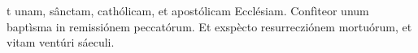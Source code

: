 t unam, sânctam, cathólicam, et apostólicam Ecclésiam. Confìteor unum baptìsma in remissiónem peccatórum. Et exspècto resurrecziónem mortuórum, et vitam ventúri sáeculi.
